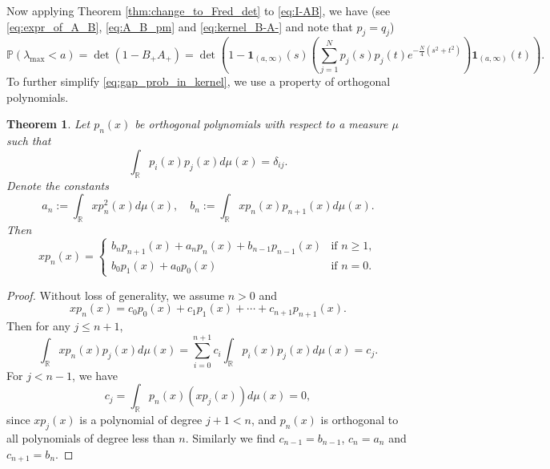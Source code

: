 \documentclass[11pt, a4paper]{article}
\numberwithin{equation}{section}
\newcommand{\id}{\mathbf{1}}
\newcommand{\realR}{\mathbb{R}}
\newcommand{\Prob}{\mathbb{P}}
\newtheorem{thm}{Theorem}
\theoremstyle{definition}
\theoremstyle{remark}
\begin{document}
Now applying Theorem \ref{thm:change_to_Fred_det} to \eqref{eq:I-AB}, we have (see \eqref{eq:expr_of_A_B}, \eqref{eq:A_B_pm} and \eqref{eq:kernel_B-A-} and note that $p_j = q_j$)
\begin{equation} \label{eq:gap_prob_in_kernel}
  \Prob(\lambda_{\max} < a) = \det(1 - B_+ A_+) = \det \left( 1 - \id_{(a, \infty)}(s) \left( \sum^N_{j = 1} p_j(s) p_j(t) e^{-\frac{N}{4}(s^2 + t^2)} \right) \id_{(a, \infty)}(t) \right).
\end{equation}
To further simplify \eqref{eq:gap_prob_in_kernel}, we use a property of orthogonal polynomials.
\begin{thm} \label{thm:3_term_reccurrence}
  Let $p_n(x)$ be orthogonal polynomials with respect to a measure $\mu$ such that
  \begin{equation}
    \int_{\realR} p_i(x) p_j(x) d\mu(x) = \delta_{ij}.
  \end{equation}
  Denote the constants
  \begin{equation}
    a_n := \int_{\realR} x p^2_n(x) d\mu(x), \quad b_n := \int_{\realR} xp_n(x)p_{n + 1}(x) d\mu(x).
  \end{equation}
  Then
  \begin{equation}
    xp_n(x) =
    \begin{cases}
      b_n p_{n + 1}(x) + a_n p_n(x) + b_{n - 1} p_{n - 1}(x) & \text{if $n \geq 1$}, \\
      b_0 p_1(x) + a_0 p_0(x) & \text{if $n = 0$}.
    \end{cases}
  \end{equation}
\end{thm}
\begin{proof}
  Without loss of generality, we assume $n > 0$ and
  \begin{equation}
    x p_n(x) = c_0 p_0(x) + c_1 p_1(x) + \dotsb + c_{n + 1} p_{n + 1}(x).
  \end{equation}
  Then for any $j \leq n + 1$,
  \begin{equation}
    \int_{\realR} x p_n(x) p_j(x) d\mu(x) = \sum^{n + 1}_{i = 0} c_i \int_{\realR} p_i(x) p_j(x) d\mu(x) = c_j.
  \end{equation}
  For $j < n - 1$, we have
  \begin{equation}
    c_j = \int_{\realR} p_n(x) (x p_j(x)) d\mu(x) = 0,
  \end{equation}
  since $xp_j(x)$ is a polynomial of degree $j + 1 < n$, and $p_n(x)$ is orthogonal to all polynomials of degree less than $n$. Similarly we find $c_{n - 1} = b_{n - 1}$, $c_n = a_n$ and $c_{n + 1} = b_n$.
\end{proof}
\end{document}
